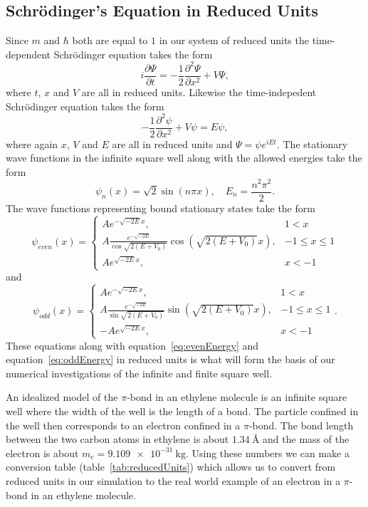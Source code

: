 \documentclass[12pt,a4paper]{article}
\newcommand{\pdiff}[2]{\frac{\partial #1}{\partial #2}}
\newcommand{\pdiffn}[3]{\frac{\partial^{#3} #1}{\partial #2^{#3}}}
\begin{document}
\subsection{Schrödinger's Equation in Reduced Units}
Since $m$ and $\hbar$ both are equal to $1$ in our system of reduced units the time-dependent Schrödinger equation takes the form
\begin{equation}
i \pdiff{\Psi}{t} = - \frac{1}{2} \pdiffn{\Psi}{x}{2} + V \Psi,
\end{equation}
where $t$, $x$ and $V$ are all in reduced units. Likewise the time-indepedent Schrödinger equation takes the form
\begin{equation}
- \frac{1}{2} \pdiffn{\psi}{x}{2} + V \psi = E \psi,
\end{equation}
where again $x$, $V$ and $E$ are all in reduced units and $\Psi = \psi e^{i E t}$. The stationary wave functions in the infinite square well along with the allowed energies take the form
\begin{equation}
\psi_n(x) = \sqrt{2} \sin (n \pi x), \quad E_n = \frac{n^2 \pi^2}{2}.
\end{equation}
The wave functions representing bound stationary states take the form
\begin{equation}
\psi_{even}(x) = \begin{cases} A e^{-\sqrt{-2 E} x}, & 1 < x \\
                               A \frac{e^{-\sqrt{-2 E}}}{\cos \sqrt{2(E + V_0)}} \cos \left( \sqrt{2(E + V_0)} x \right), & -1 \leq x \leq 1 \\
                               A e^{\sqrt{-2 E} x}, & x < -1 \end{cases}
\end{equation}
and
\begin{equation}
\psi_{odd}(x) = \begin{cases} A e^{-\sqrt{-2 E} x}, & 1 < x \\
                              A \frac{e^{-\sqrt{-2 E}}}{\sin \sqrt{2(E + V_0)}} \sin \left( \sqrt{2(E + V_0)} x \right), & -1 \leq x \leq 1 \\
                              -A e^{\sqrt{-2 E} x}, & x < -1 \end{cases}.
\end{equation}
These equations along with equation~\eqref{eq:evenEnergy} and equation~\eqref{eq:oddEnergy} in reduced units is what will form the basis of our numerical investigations of the infinite and finite square well.

An idealized model of the $\pi$-bond in an ethylene molecule is an infinite square well where the width of the well is the length of a bond. The particle confined in the well then corresponds to an electron confined in a $\pi$-bond. The bond length between the two carbon atoms in ethylene is about $\SI{1.34}{\angstrom}$ and the mass of the electron is about $m_e = \SI{9.109e-31}{\kilo\gram}$. Using these numbers we can make a conversion table (table~\ref{tab:reducedUnits}) which allows us to convert from reduced units in our simulation to the real world example of an electron in a $\pi$-bond in an ethylene molecule.
\end{document}
